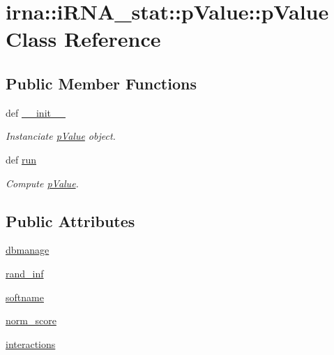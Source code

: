 \hypertarget{classirna_1_1iRNA__stat_1_1pValue_1_1pValue}{
\section{irna\-:\-:i\-R\-N\-A\-\_\-stat\-:\-:p\-Value\-:\-:p\-Value \-Class \-Reference}
\label{classirna_1_1iRNA__stat_1_1pValue_1_1pValue}
}
\subsection*{\-Public \-Member \-Functions}
\begin{DoxyCompactItemize}
\item 
def \hyperlink{classirna_1_1iRNA__stat_1_1pValue_1_1pValue_acf5632c302f4245821461ad37c1aba93}{\-\_\-\-\_\-init\-\_\-\-\_\-}
\begin{DoxyCompactList}\small\item\em \-Instanciate \hyperlink{classirna_1_1iRNA__stat_1_1pValue_1_1pValue}{p\-Value} object. \end{DoxyCompactList}\item 
def \hyperlink{classirna_1_1iRNA__stat_1_1pValue_1_1pValue_ab610f41665935156487d6072be98b749}{run}
\begin{DoxyCompactList}\small\item\em \-Compute \hyperlink{classirna_1_1iRNA__stat_1_1pValue_1_1pValue}{p\-Value}. \end{DoxyCompactList}\end{DoxyCompactItemize}
\subsection*{\-Public \-Attributes}
\begin{DoxyCompactItemize}
\item 
\hyperlink{classirna_1_1iRNA__stat_1_1pValue_1_1pValue_a2686f773b4ffd32928cfc8f8434e6aa3}{dbmanage}
\item 
\hyperlink{classirna_1_1iRNA__stat_1_1pValue_1_1pValue_abee6cce9b5518599eb092ef0887a4634}{rand\-\_\-inf}
\item 
\hyperlink{classirna_1_1iRNA__stat_1_1pValue_1_1pValue_ab6dadf2bca6caeb00b1d6e66f13c7928}{softname}
\item 
\hyperlink{classirna_1_1iRNA__stat_1_1pValue_1_1pValue_a4b5d55784919b7aeff2348c9eb647024}{norm\-\_\-score}
\item 
\hyperlink{classirna_1_1iRNA__stat_1_1pValue_1_1pValue_ab68f3b66c340fce99e3cc530297a8947}{interactions}
\end{DoxyCompactItemize}


